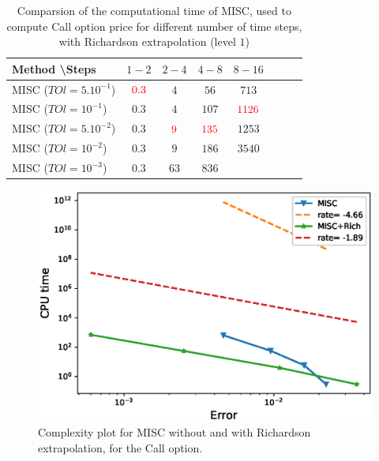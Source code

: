 \documentclass[11pt]{article}
\begin{document}
\begin{table}[h!]
	\centering
	\begin{tabular}{l*{6}{c}r}
		Method \textbackslash  Steps            & $1-2$ & $2-4$ & $4-8$ & $8-16$ &   \\
		\hline
		MISC ($TOl=5.10^{-1}$) & $\red{0.3}$ & $4$ & $56$ & $713$  \\
		MISC ($TOl=10^{-1}$)  & $0.3$  & $4$ & $107$ & $\red{1126}$  \\
		MISC ($TOl=5.10^{-2}$)   & $0.3$  & $\red{9}$ & $\red{135}$ & $1253$  \\
		MISC ($TOl=10^{-2}$)  &  $0.3$  & $9$ & $186$ & $3540$  \\
		MISC ($TOl=10^{-3}$)   & $0.3$  & $63$ & $836$ & $$  \\
		\hline
		\hline
	\end{tabular}
	\caption{Comparsion of the computational time of  MISC, used to compute Call option price  for different number of time steps, with Richardson extrapolation (level $1$)}
	\label{Comparsion of the computational time of  MC and MISC, used to compute Call option price  for different number of time steps, with Richardson extrapolation (level $1$)}
\end{table}

%	







\begin{figure}[h!]
	\centering
	\includegraphics[width=0.7\linewidth]{./figures/Call_Complexity_rates/error_vs_time_comparision}
	
	\caption{Complexity plot for MISC without and with Richardson extrapolation, for the Call option.}
	\label{fig:Complexity plot for MC and MISC , Call, comparison}
\end{figure}
\end{document}
